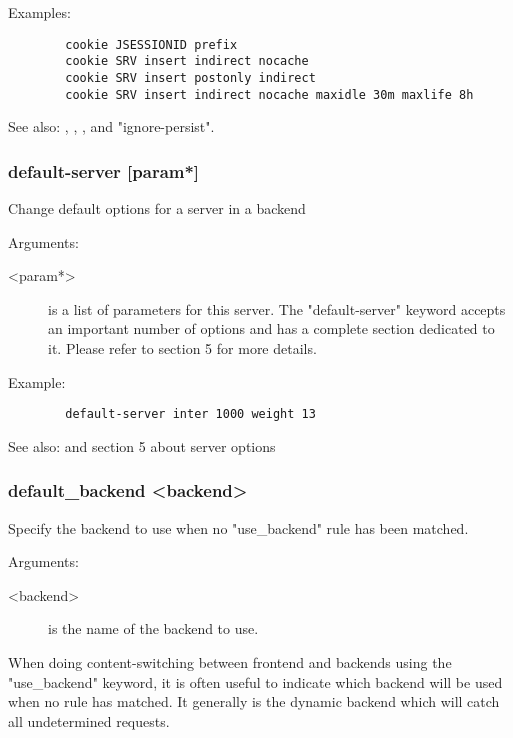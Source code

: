   Examples:
  \begin{verbatim}
        cookie JSESSIONID prefix
        cookie SRV insert indirect nocache
        cookie SRV insert postonly indirect
        cookie SRV insert indirect nocache maxidle 30m maxlife 8h
  \end{verbatim}

  See also: , , , 
             and "ignore-persist".

\subsubsection[default-server]{default-server [param*]}
  Change default options for a server in a backend
  
  
  Arguments:
  \begin{description}
  \item[<param*>]  is a list of parameters for this server. The "default-server"
              keyword accepts an important number of options and has a complete
              section dedicated to it. Please refer to section 5 for more
              details.
  \end{description}

  Example:
  \begin{verbatim}
        default-server inter 1000 weight 13
  \end{verbatim}

  See also:  and section 5 about server options

\subsubsection[default\_backend]{default\_backend <backend>}
  Specify the backend to use when no "use\_backend" rule has been matched.
  
  
  Arguments:
  \begin{description}
  \item[<backend>] is the name of the backend to use.
  \end{description}

  When doing content-switching between frontend and backends using the
  "use\_backend" keyword, it is often useful to indicate which backend will be
  used when no rule has matched. It generally is the dynamic backend which
  will catch all undetermined requests.

